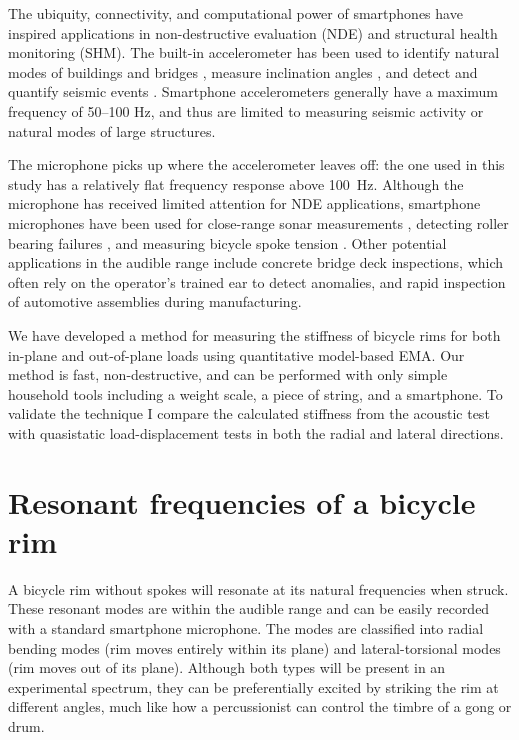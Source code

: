\documentclass[../thesis.tex]{subfiles}
\begin{document}
The ubiquity, connectivity, and computational power of smartphones have inspired applications in non-destructive evaluation (NDE) and structural health monitoring (SHM). The built-in accelerometer has been used to identify natural modes of buildings and bridges \cite{Feng2015}, measure inclination angles \cite{Morgenthal2012}, and detect and quantify seismic events \cite{Kong2016}. Smartphone accelerometers generally have a maximum frequency of \numrange{50}{100} \si{Hz}, and thus are limited to measuring seismic activity or natural modes of large structures.

The microphone picks up where the accelerometer leaves off: the one used in this study has a relatively flat frequency response above \SI{100}{Hz}. Although the microphone has received limited attention for NDE applications, smartphone microphones have been used for close-range sonar measurements \cite{Morgenthal2012}, detecting roller bearing failures \cite{Grebenik2016}, and measuring bicycle spoke tension \cite{Pepelko2016}. Other potential applications in the audible range include concrete bridge deck inspections, which often rely on the operator's trained ear to detect anomalies, and rapid inspection of automotive assemblies during manufacturing.

We have developed a method for measuring the stiffness of bicycle rims for both in-plane and out-of-plane loads using quantitative model-based EMA. Our method is fast, non-destructive, and can be performed with only simple household tools including a weight scale, a piece of string, and a smartphone. To validate the technique I compare the calculated stiffness from the acoustic test with quasistatic load-displacement tests in both the radial and lateral directions.


\section{Resonant frequencies of a bicycle rim}

A bicycle rim without spokes will resonate at its natural frequencies when struck. These resonant modes are within the audible range and can be easily recorded with a standard smartphone microphone. The modes are classified into radial bending modes (rim moves entirely within its plane) and lateral-torsional modes (rim moves out of its plane). Although both types will be present in an experimental spectrum, they can be preferentially excited by striking the rim at different angles, much like how a percussionist can control the timbre of a gong or drum.
\end{document}
